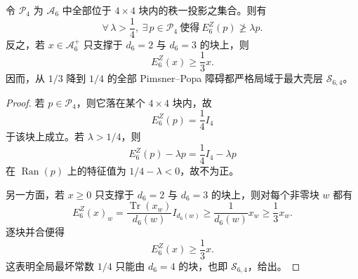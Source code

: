\begin{proposition}\label{prop:xi-time-part9ze-window6-jones-ray-maxshell-localization}
令 \(\mathcal P_4\) 为 \(\mathcal A_6\) 中全部位于 \(4\times 4\) 块内的秩一投影之集合。则有
\[
\forall\,\lambda>\frac14,\ \exists\,p\in \mathcal P_4
\ \text{使得}\ 
E_6^Z(p)\not\ge \lambda p.
\]
反之，若 \(x\in \mathcal A_6^+\) 只支撑于 \(d_6=2\) 与 \(d_6=3\) 的块上，则
\[
E_6^Z(x)\ge \frac13 x.
\]
因而，从 \(1/3\) 降到 \(1/4\) 的全部 Pimsner--Popa 障碍都严格局域于最大壳层 \(\mathcal S_{6,4}\)。
\end{proposition}
\begin{proof}
若 \(p\in \mathcal P_4\)，则它落在某个 \(4\times 4\) 块内，故
\[
E_6^Z(p)=\frac14 I_4
\]
于该块上成立。若 \(\lambda>1/4\)，则
\[
E_6^Z(p)-\lambda p
=
\frac14 I_4-\lambda p
\]
在 \(\operatorname{Ran}(p)\) 上的特征值为 \(1/4-\lambda<0\)，故不为正。

另一方面，若 \(x\ge 0\) 只支撑于 \(d_6=2\) 与 \(d_6=3\) 的块上，则对每个非零块 \(w\) 都有
\[
E_6^Z(x)_w
=
\frac{\operatorname{Tr}(x_w)}{d_6(w)}I_{d_6(w)}
\ge
\frac{1}{d_6(w)}x_w
\ge
\frac13 x_w.
\]
逐块并合便得
\[
E_6^Z(x)\ge \frac13 x.
\]
这表明全局最坏常数 \(1/4\) 只能由 \(d_6=4\) 的块，也即 \(\mathcal S_{6,4}\)，给出。
\end{proof}

